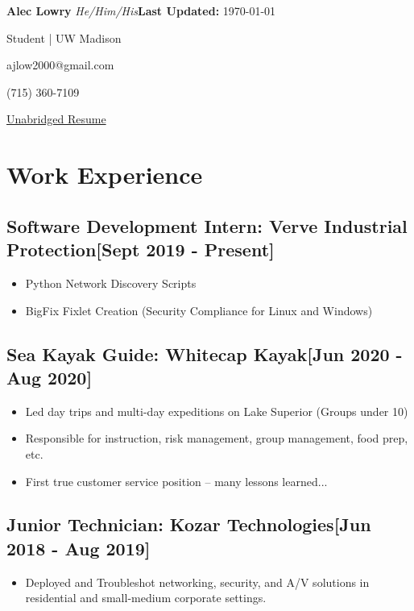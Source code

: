 \documentclass{article}
\begin{document}
\textbf{Alec Lowry} \emph{He/Him/His}\hfill{\textbf{Last Updated:} \today}

Student | UW Madison%

ajlow2000@gmail.com

(715) 360-7109

\href{https://github.com/Ajlow2000/resume/blob/master/main/AlecLowry_main.pdf}{Unabridged Resume}

\section{ Work Experience}

    \subsection{\textbf{Software Development Intern}: Verve Industrial Protection\hfill[Sept 2019 - Present]}
        \begin{itemize}
            \item Python Network Discovery Scripts
            \item BigFix Fixlet Creation (Security Compliance for Linux and Windows)
        \end{itemize}

    \subsection{\textbf{Sea Kayak Guide}: Whitecap Kayak\hfill[Jun 2020 - Aug 2020]}
        \begin{itemize}
            \item Led day trips and multi-day expeditions on Lake Superior (Groups under 10)
            \item Responsible for instruction, risk management, group management, food prep, etc.
            \item First true customer service position -- many lessons learned...
        \end{itemize}

    \subsection{\textbf{Junior Technician}: Kozar Technologies\hfill[Jun 2018 - Aug 2019]}
        \begin{itemize}
            \item Deployed and Troubleshot networking, security, and A/V solutions in residential and small-medium corporate settings.
        \end{itemize}
\end{document}
